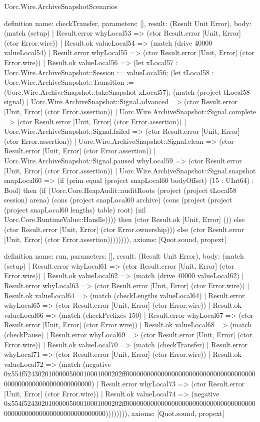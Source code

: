 \begin{lexlean}{Uorc.Wire.ArchiveSnapshotScenarios}
\begin{semanticmodule}
definition{
  name: checkTransfer,
  parameters: [],
  result: (Result Unit Error),
  body: (match (setup)
    | Result.error whyLocal53 => (ctor Result.error [Unit, Error] (ctor Error.wire))
    | Result.ok valueLocal54 => (match (drive 40000 valueLocal54)
      | Result.error whyLocal55 => (ctor Result.error [Unit, Error] (ctor Error.wire))
      | Result.ok valueLocal56 => (let xLocal57 : Uorc.Wire.ArchiveSnapshot::Session := valueLocal56; (let tLocal58 : Uorc.Wire.ArchiveSnapshot::Transition := (Uorc.Wire.ArchiveSnapshot::takeSnapshot xLocal57); (match (project tLocal58 signal)
        | Uorc.Wire.ArchiveSnapshot::Signal.advanced => (ctor Result.error [Unit, Error] (ctor Error.assertion))
        | Uorc.Wire.ArchiveSnapshot::Signal.complete => (ctor Result.error [Unit, Error] (ctor Error.assertion))
        | Uorc.Wire.ArchiveSnapshot::Signal.failed => (ctor Result.error [Unit, Error] (ctor Error.assertion))
        | Uorc.Wire.ArchiveSnapshot::Signal.clean => (ctor Result.error [Unit, Error] (ctor Error.assertion))
        | Uorc.Wire.ArchiveSnapshot::Signal.paused whyLocal59 => (ctor Result.error [Unit, Error] (ctor Error.assertion))
        | Uorc.Wire.ArchiveSnapshot::Signal.snapshot snapLocal60 => (if (prim equal (project snapLocal60 bodyOffset) (15 : UInt64) : Bool) then (if (Uorc.Core.HeapAudit::auditRoots (project (project tLocal58 session) arena) (cons (project snapLocal60 archive) (cons (project (project (project snapLocal60 lengths) table) root) (nil Uorc.Core.RuntimeValue::Handle)))) then (ctor Result.ok [Unit, Error] ()) else (ctor Result.error [Unit, Error] (ctor Error.ownership))) else (ctor Result.error [Unit, Error] (ctor Error.assertion)))))))),
  axioms: [Quot.sound, propext]
}

definition{
  name: run,
  parameters: [],
  result: (Result Unit Error),
  body: (match (setup)
    | Result.error whyLocal61 => (ctor Result.error [Unit, Error] (ctor Error.wire))
    | Result.ok valueLocal62 => (match (drive 40000 valueLocal62)
      | Result.error whyLocal63 => (ctor Result.error [Unit, Error] (ctor Error.wire))
      | Result.ok valueLocal64 => (match (checkLengths valueLocal64)
        | Result.error whyLocal65 => (ctor Result.error [Unit, Error] (ctor Error.wire))
        | Result.ok valueLocal66 => (match (checkPrefixes 150)
          | Result.error whyLocal67 => (ctor Result.error [Unit, Error] (ctor Error.wire))
          | Result.ok valueLocal68 => (match (checkPause)
            | Result.error whyLocal69 => (ctor Result.error [Unit, Error] (ctor Error.wire))
            | Result.ok valueLocal70 => (match (checkTransfer)
              | Result.error whyLocal71 => (ctor Result.error [Unit, Error] (ctor Error.wire))
              | Result.ok valueLocal72 => (match (negative 0x554f5243020100000500010001000202ff00000000000000000000000000000000000000000000000000000000000000)
                | Result.error whyLocal73 => (ctor Result.error [Unit, Error] (ctor Error.wire))
                | Result.ok valueLocal74 => (negative 0x554f5243020100000500010001000202ff000000000000000000000000000000000000000000000000000000000000000000)))))))),
  axioms: [Quot.sound, propext]
}
\end{semanticmodule}
\end{lexlean}
